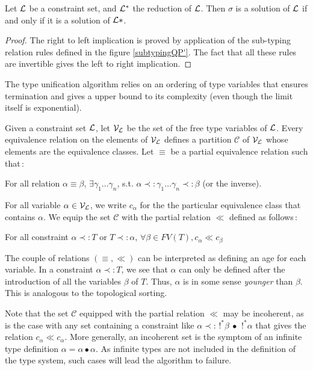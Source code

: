 \begin{lemma} \label{reductionQP'}
	Let $\mathcal{L}$ be a constraint set, and $\mathcal{L}^*$ the reduction of $\mathcal{L}$. Then $\sigma$ is a solution of $\mathcal{L}$ if and only if it is
	a solution of $\mathcal{L}*$.
	
	\begin{proof}
		The right to left implication is proved by application of the sub-typing relation rules defined in the figure \ref{subtypingQP'}.
		The fact that all these rules are invertible gives the left to right implication.
	\end{proof}
\end{lemma}

The type unification algorithm relies on an ordering of type variables that ensures termination and gives a upper
bound to its complexity (even though the limit itself is exponential).

\begin{defn} Given a constraint set $\mathcal{L}$, let $\mathcal{V}_{\mathcal{L}}$ be the set of the free type variables of $\mathcal{L}$. Every equivalence relation
	on the elements of $\mathcal{V}_{\mathcal{L}}$ defines a partition $\mathcal{C}$ of $\mathcal{V}_{\mathcal{L}}$ whose elements are the equivalence classes.
	Let $\equiv$ be a partial equivalence relation such that\,:
		\begin{center}
			For all relation $\alpha \equiv \beta$, $\exists \gamma_1 \dots \gamma_n$, s.t. $\alpha \prec: \gamma_1 \dots
				\gamma_n \prec: \beta$ (or the inverse).
		\end{center}
	For all variable $\alpha \in \mathcal{V}_{\mathcal{L}}$, we write $c_\alpha$ for the the particular equivalence class that contains $\alpha$.
	We equip the set $\mathcal{C}$ with the partial relation $\ll$ defined as follows\,:
  	\begin{center}
  	  For all constraint $\alpha \prec: T$ or $T \prec: \alpha$, $\forall \beta \in FV(T), c_\alpha \ll c_\beta$
  	\end{center}
\end{defn}

The couple of relations $(\equiv, \ll)$ can be interpreted as defining an age for each variable. In a constraint $\alpha \prec: T$,
we see that $\alpha$ can only be defined after the introduction of all the variables $\beta$ of $T$. Thus, $\alpha$ is in some sense
\emph{younger} than $\beta$. This is analogous to the topological sorting.

Note that the set $\mathcal{C}$ equipped with the partial relation $\ll$ may be incoherent, as is the case with any set containing
a constraint like $\alpha \prec: \,!^*\beta ~\bullet~ \,!^*\alpha$ that gives the relation $c_\alpha \ll c_\alpha$. More generally,
an incoherent set is the symptom of an infinite type definition $\alpha = \alpha \bullet \alpha$. As infinite types are not included
in the definition of the type system, such cases will lead the algorithm to failure.
  
